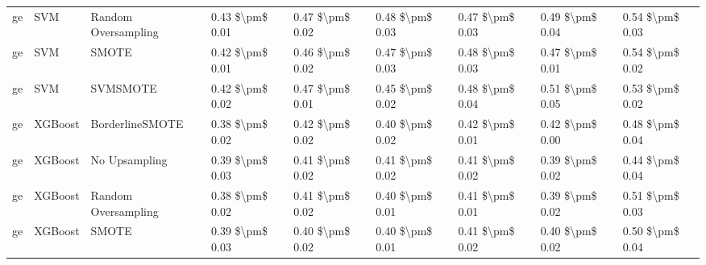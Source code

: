 \begin{tabular}{lllllllll}
      ge &                             SVM &           Random Oversampling & 0.43 \$\textbackslash pm\$ 0.01 &           0.47 \$\textbackslash pm\$ 0.02 &       0.48 \$\textbackslash pm\$ 0.03 &        0.47 \$\textbackslash pm\$ 0.03 &                         0.49 \$\textbackslash pm\$ 0.04 &     0.54 \$\textbackslash pm\$ 0.03 \\
      ge &                             SVM &                         SMOTE & 0.42 \$\textbackslash pm\$ 0.01 &           0.46 \$\textbackslash pm\$ 0.02 &       0.47 \$\textbackslash pm\$ 0.03 &        0.48 \$\textbackslash pm\$ 0.03 &                         0.47 \$\textbackslash pm\$ 0.01 &     0.54 \$\textbackslash pm\$ 0.02 \\
      ge &                             SVM &                      SVMSMOTE & 0.42 \$\textbackslash pm\$ 0.02 &           0.47 \$\textbackslash pm\$ 0.01 &       0.45 \$\textbackslash pm\$ 0.02 &        0.48 \$\textbackslash pm\$ 0.04 &                         0.51 \$\textbackslash pm\$ 0.05 &     0.53 \$\textbackslash pm\$ 0.02 \\
      ge &                         XGBoost &               BorderlineSMOTE & 0.38 \$\textbackslash pm\$ 0.02 &           0.42 \$\textbackslash pm\$ 0.02 &       0.40 \$\textbackslash pm\$ 0.02 &        0.42 \$\textbackslash pm\$ 0.01 &                         0.42 \$\textbackslash pm\$ 0.00 &     0.48 \$\textbackslash pm\$ 0.04 \\
      ge &                         XGBoost &                 No Upsampling & 0.39 \$\textbackslash pm\$ 0.03 &           0.41 \$\textbackslash pm\$ 0.02 &       0.41 \$\textbackslash pm\$ 0.02 &        0.41 \$\textbackslash pm\$ 0.02 &                         0.39 \$\textbackslash pm\$ 0.02 &     0.44 \$\textbackslash pm\$ 0.04 \\
      ge &                         XGBoost &           Random Oversampling & 0.38 \$\textbackslash pm\$ 0.02 &           0.41 \$\textbackslash pm\$ 0.02 &       0.40 \$\textbackslash pm\$ 0.01 &        0.41 \$\textbackslash pm\$ 0.01 &                         0.39 \$\textbackslash pm\$ 0.02 &     0.51 \$\textbackslash pm\$ 0.03 \\
      ge &                         XGBoost &                         SMOTE & 0.39 \$\textbackslash pm\$ 0.03 &           0.40 \$\textbackslash pm\$ 0.02 &       0.40 \$\textbackslash pm\$ 0.01 &        0.41 \$\textbackslash pm\$ 0.02 &                         0.40 \$\textbackslash pm\$ 0.02 &     0.50 \$\textbackslash pm\$ 0.04 \\

\end{tabular}
